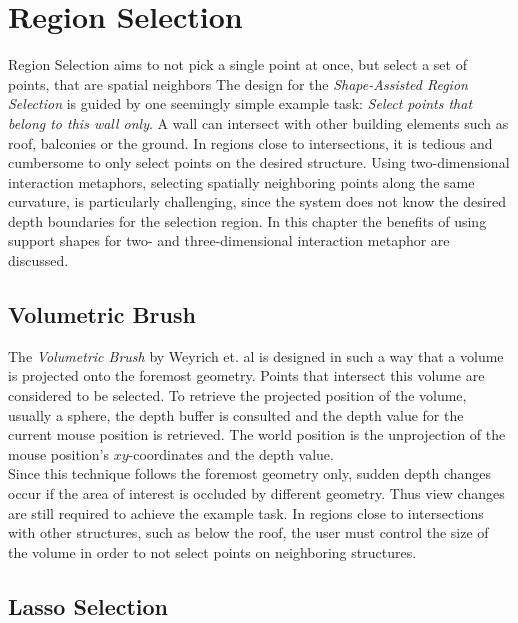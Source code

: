 \section{Region Selection}

Region Selection aims to not pick a single point at once, but select a set of points, that are spatial neighbors
The design for the \textit{Shape-Assisted Region Selection} is guided by one seemingly simple example task: \textit{Select points that belong to this wall only}. A wall can intersect with other building elements such as roof, balconies or the ground. In regions close to intersections, it is tedious and cumbersome to only select points on the desired structure. Using two-dimensional interaction metaphors, selecting spatially neighboring points along the same curvature, is particularly challenging, since the system does not know the desired depth boundaries for the selection region. In this chapter the benefits of using support shapes for two- and three-dimensional interaction metaphor are discussed. 


\subsection{Volumetric Brush}

The \textit{Volumetric Brush} by Weyrich et. al\cite{weyrich2004post} is designed in such a way that a volume is projected onto the foremost geometry. Points that intersect this volume are considered to be selected. To retrieve the projected position of the volume, usually a sphere, the depth buffer is consulted and the depth value for the current mouse position is retrieved. The world position is the unprojection of the mouse position's $xy$-coordinates and the depth value. 
\\
Since this technique follows the foremost geometry only, sudden depth changes occur if the area of interest is occluded by different geometry. Thus view changes are still required to achieve the example task. In regions close to intersections with other structures, such as below the roof, the user must control the size of the volume in order to not select points on neighboring structures. 


\subsection{Lasso Selection}

